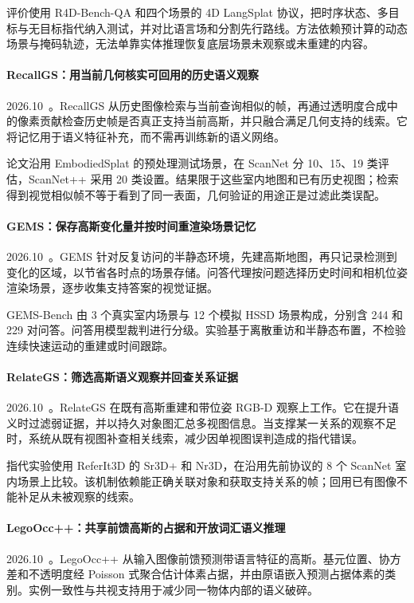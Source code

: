评价使用 R4D-Bench-QA 和四个场景的 4D LangSplat 协议，把时序状态、多目标与无目标指代纳入测试，并对比语言场和分割先行路线。方法依赖预计算的动态场景与掩码轨迹，无法单靠实体推理恢复底层场景未观察或未重建的内容。

\paragraph{RecallGS：用当前几何核实可回用的历史语义观察}
2026.10~\cite{2610_31293}。RecallGS 从历史图像检索与当前查询相似的帧，再通过透明度合成中的像素贡献检查历史帧是否真正支持当前高斯，并只融合满足几何支持的线索。它将记忆用于语义特征补充，而不需再训练新的语义网络。

论文沿用 EmbodiedSplat 的预处理测试场景，在 ScanNet 分 10、15、19 类评估，ScanNet++ 采用 20 类设置。结果限于这些室内地图和已有历史视图；检索得到视觉相似帧不等于看到了同一表面，几何验证的用途正是过滤此类误配。

\paragraph{GEMS：保存高斯变化量并按时间重渲染场景记忆}
2026.10~\cite{2610_33158}。GEMS 针对反复访问的半静态环境，先建高斯地图，再只记录检测到变化的区域，以节省各时点的场景存储。问答代理按问题选择历史时间和相机位姿渲染场景，逐步收集支持答案的视觉证据。

GEMS-Bench 由 3 个真实室内场景与 12 个模拟 HSSD 场景构成，分别含 244 和 229 对问答。问答用模型裁判进行分级。实验基于离散重访和半静态布置，不检验连续快速运动的重建或时间跟踪。

\paragraph{RelateGS：筛选高斯语义观察并回查关系证据}
2026.10~\cite{2610_33868}。RelateGS 在既有高斯重建和带位姿 RGB-D 观察上工作。它在提升语义时过滤弱证据，并以持久对象图汇总多视图信息。当支撑某一关系的观察不足时，系统从既有视图补查相关线索，减少因单视图误判造成的指代错误。

指代实验使用 ReferIt3D 的 Sr3D+ 和 Nr3D，在沿用先前协议的 8 个 ScanNet 室内场景上比较。该机制依赖能正确关联对象和获取支持关系的帧；回用已有图像不能补足从未被观察的线索。

\paragraph{LegoOcc++：共享前馈高斯的占据和开放词汇语义推理}
2026.10~\cite{2610_34093}。LegoOcc++ 从输入图像前馈预测带语言特征的高斯。基元位置、协方差和不透明度经 Poisson 式聚合估计体素占据，并由原语嵌入预测占据体素的类别。实例一致性与共视支持用于减少同一物体内部的语义破碎。

